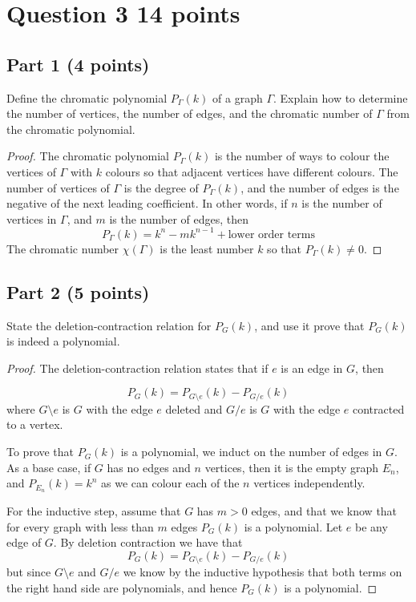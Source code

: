 \documentclass{amsart}
\begin{document}
 \section*{Question 3 14 points}

 \subsection*{Part 1 (4 points)}
 Define the chromatic polynomial $P_\Gamma(k)$ of a graph $\Gamma$.  Explain how to determine the number of vertices, the number of edges, and the chromatic number of $\Gamma$ from the chromatic polynomial.

 \begin{proof}
   The chromatic polynomial $P_\Gamma(k)$ is the number of ways to colour the vertices of $\Gamma$ with $k$ colours so that adjacent vertices have different colours.
   The number of vertices of $\Gamma$ is the degree of $P_\Gamma(k)$, and the number of edges is the negative of the next leading coefficient.  In other words, if $n$ is the number of vertices in $\Gamma$, and $m$ is the number of edges, then
   $$P_\Gamma(k)=k^n-mk^{n-1}+\text{lower order terms}$$
  The chromatic number $\chi(\Gamma)$ is the least number $k$ so that $P_\Gamma(k)\neq 0$. 
   \end{proof}
 
 \subsection*{Part 2 (5 points)}

 State the deletion-contraction relation for $P_G(k)$, and use it prove that $P_G(k)$ is indeed a polynomial.

 \begin{proof}
   The deletion-contraction relation states that if $e$ is an edge in $G$, then

   $$P_G(k)=P_{G\setminus e}(k)-P_{G/e}(k)$$
   where $G\setminus e$ is $G$ with the edge $e$ deleted and $G/e$ is $G$ with the edge $e$ contracted to a vertex.

   To prove that $P_G(k)$ is a polynomial, we induct on the number of edges in $G$.  As a base case, if $G$ has no edges and $n$ vertices, then it is the empty graph $E_n$, and $P_{E_n}(k)=k^n$ as we can colour each of the $n$ vertices independently.

   For the inductive step, assume that $G$ has $m>0$ edges, and that we know that for every graph with less than $m$ edges $P_G(k)$ is a polynomial.  Let $e$ be any edge of $G$.  By deletion contraction we have that
   $$P_G(k)=P_{G\setminus e}(k)-P_{G/e}(k)$$
but since $G\setminus e$ and $G/e$ we know by the inductive hypothesis that both terms on the right hand side are polynomials, and hence $P_G(k)$ is a polynomial.
 \end{proof}
\end{document}
